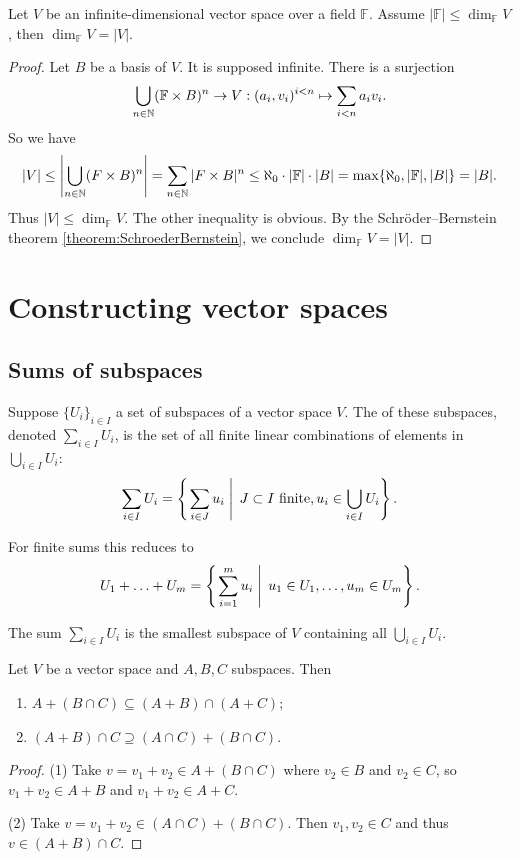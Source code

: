 \begin{lemma}
Let $V$ be an infinite-dimensional vector space over a field $\mathbb{F}$. Assume $|\mathbb{F}|\leq \dim_{\mathbb{F}} V$, then $\dim_{\mathbb{F}} V = |V|$. \label{lemma:vsCardinality}
\end{lemma}
\begin{proof}
Let $B$ be a basis of $V$. It is supposed infinite. There is a surjection
\[\bigcup_{n\in\mathbb{N}}(\mathbb{F}\times B)^{n} \to V: (a_i,v_i)^{i<n} \mapsto \sum_{i<n}a_iv_i. \]
So we have
\[ |V| \leq \left|\bigcup_{n\in\mathbb{N}}(F\times B)^{n}\right| = \sum_{n\in \mathbb{N}}|F\times B|^n \leq \aleph_0\cdot |\mathbb{F}| \cdot |B| = \max\{\aleph_0, |\mathbb{F}|, |B|\} = |B|. \]
Thus $|V|\leq \dim_{\mathbb{F}} V$. The other inequality is obvious. By the Schröder–Bernstein theorem \ref{theorem:SchroederBernstein}, we conclude $\dim_{\mathbb{F}} V = |V|$.
\end{proof}

\section{Constructing vector spaces}
\subsection{Sums of subspaces}
\begin{definition}
Suppose $\{U_i\}_{i\in I}$ a set of subspaces of a vector space $V$. The  of these subspaces, denoted $\sum_{i\in I}U_i$, is the set of all finite linear combinations of elements in $\bigcup_{i\in I}U_i$:
\[ \sum_{i\in I}U_i =  \left\{\left. \sum_{i\in J} u_i \;\right|\; \text{$J\subset I$ finite}, u_i\in \bigcup_{i\in I}U_i \right\}. \]
\end{definition}
For finite sums this reduces to
\[ U_1+\ldots + U_m = \left\{\left. \sum_{i=1}^m u_i \;\right|\; u_1\in U_1, \ldots, u_m\in U_m \right\}. \]

\begin{proposition}
The sum $\sum_{i\in I}U_i$ is the smallest subspace of $V$ containing all $\bigcup_{i\in I}U_i$.
\end{proposition}

\begin{proposition}
Let $V$ be a vector space and $A,B,C$ subspaces. Then
\begin{enumerate}
\item $A+(B\cap C) \subseteq (A+B)\cap (A+C)$;
\item $(A+B)\cap C \supseteq (A\cap C) + (B\cap C)$. 
\end{enumerate}
\end{proposition}
\begin{proof}
(1) Take $v = v_1+v_2 \in A+(B\cap C)$ where $v_2 \in B$ and $v_2 \in C$, so $v_1+v_2\in A+B$ and $v_1+v_2\in A+C$.

(2) Take $v = v_1+v_2\in (A\cap C) + (B\cap C)$. Then $v_1,v_2\in C$ and thus $v\in (A+B)\cap C$.
\end{proof}

